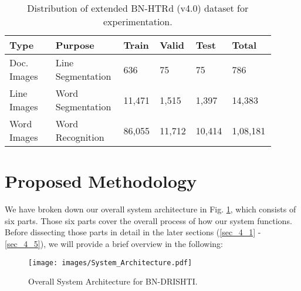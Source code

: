 \documentclass[runningheads]{llncs}
\begin{document}
\vspace{-4mm}
\begin{table}
\centering
\caption{Distribution of extended BN-HTRd (v4.0) dataset for experimentation.\protect\footnotemark}\label{drishti-tab1}
\begin{tabular}{|p{0.17\linewidth}|p{0.25\linewidth}|p{0.12\linewidth}|p{0.12\linewidth}|p{0.12\linewidth}|p{0.12\linewidth}|}
\hline
\textbf{Type} &   \textbf{Purpose} &  \textbf{Train} & \textbf{Valid} & \textbf{Test} & \textbf{Total}\\
\hline
\hline
Doc. Images & Line Segmentation & 636 & 75 & 75 & 786\\
\hline
Line Images & Word Segmentation & 11,471 & 1,515 & 1,397 & 14,383\\
\hline
Word Images & Word Recognition & 86,055 & 11,712 & 10,414 & 1,08,181\\
\hline
\end{tabular}
\vspace{-8mm}
\end{table}


\vspace{-2mm}

\section{Proposed Methodology}
\vspace{-1mm}

We have broken down our overall system architecture in Fig. \ref{drishti-fig1}, which consists of six parts. Those six parts cover the overall process of how our system functions. Before dissecting those parts in detail in the later sections (\ref{sec_4_1} - \ref{sec_4_5}), we will provide a brief overview in the following:

\begin{figure}[h]
\texttt{[image: images/System\_Architecture.pdf]}
\vspace{-6mm}
\caption{Overall System Architecture for BN-DRISHTI.} 
\vspace{-4mm}
\label{drishti-fig1}
\end{figure}
\end{document}
